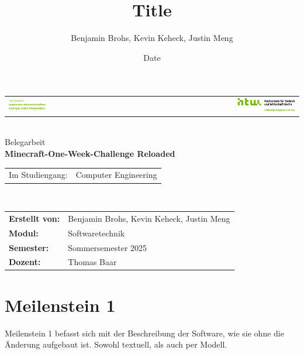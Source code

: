 \documentclass{article}
\title{Title}
\author{Benjamin Brohs, Kevin Keheck, Justin Meng}
\date{Date}
\begin{document}

\begin{titlepage}
  \centering
	\begin{tabular}{lcr}
		\includegraphics[width=0.35\textwidth]{fachbereich.png} & \hspace{0.195\textwidth} & \includegraphics[width=0.35\textwidth]{Q04_HTW_Berlin_Logo_quer_pos_FARBIG_RGB.jpg}\\
	\end{tabular}	
	\\[3cm]
	\Large
	Belegarbeit\\
	\vspace{2cm}
	\textbf{Minecraft-One-Week-Challenge Reloaded}\\
	\vspace{2cm}
	\begin{tabular}{ll} 
		Im Studiengang: & Computer Engineering \\		
	\end{tabular}	
	\\[3cm]
	\normalsize
	\begin{tabular}{ll}
	      \textbf{Erstellt von:} & Benjamin Brohs, Kevin Keheck, Justin Meng \\
        \textbf{Modul:} & Softwaretechnik \\
        \textbf{Semester:} & Sommersemester 2025 \\
	\textbf{Dozent:} & Thomas Baar
	\end{tabular}	
\end{titlepage}

\tableofcontents

\newpage


\section{Meilenstein 1} \label{sec:ms1}

Meilenstein 1 befasst sich mit der Beschreibung der Software, wie sie ohne die Änderung aufgebaut ist. Sowohl textuell, als auch per Modell.
\end{document}
